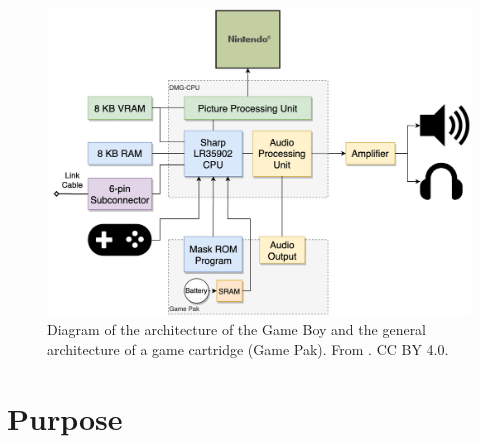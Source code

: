 \begin{figure}[H]
    \centering
    \includegraphics[scale=0.35]{figures/gbdiagram.png}
    \caption{Diagram of the architecture of the Game Boy and the general architecture of a game cartridge (Game Pak). From \cite{gameboyarchitecture}. CC BY 4.0.}
    \label{fig:GameBoyArch-fig}
\end{figure}




\newpage
\section{Purpose}

